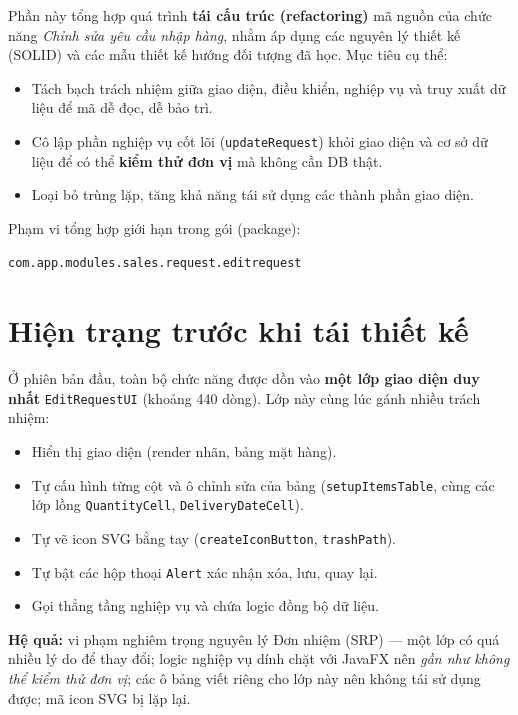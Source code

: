 \documentclass[12pt,a4paper]{article}
\begin{document}
Phần này tổng hợp quá trình \textbf{tái cấu trúc (refactoring)} mã nguồn của
chức năng \emph{Chỉnh sửa yêu cầu nhập hàng}, nhằm áp dụng các nguyên lý thiết
kế (SOLID) và các mẫu thiết kế hướng đối tượng đã học. Mục tiêu cụ thể:

\begin{itemize}[leftmargin=*]
  \item Tách bạch trách nhiệm giữa giao diện, điều khiển, nghiệp vụ và truy
        xuất dữ liệu để mã dễ đọc, dễ bảo trì.
  \item Cô lập phần nghiệp vụ cốt lõi (\texttt{updateRequest}) khỏi giao diện
        và cơ sở dữ liệu để có thể \textbf{kiểm thử đơn vị} mà không cần DB thật.
  \item Loại bỏ trùng lặp, tăng khả năng tái sử dụng các thành phần giao diện.
\end{itemize}

Phạm vi tổng hợp giới hạn trong gói (package):
\begin{center}
\texttt{com.app.modules.sales.request.editrequest}
\end{center}

\section{Hiện trạng trước khi tái thiết kế}

Ở phiên bản đầu, toàn bộ chức năng được dồn vào \textbf{một lớp giao diện duy
nhất} \texttt{EditRequestUI} (khoảng 440 dòng). Lớp này cùng lúc gánh nhiều
trách nhiệm:

\begin{itemize}[leftmargin=*]
  \item Hiển thị giao diện (render nhãn, bảng mặt hàng).
  \item Tự cấu hình từng cột và ô chỉnh sửa của bảng (\texttt{setupItemsTable},
        cùng các lớp lồng \texttt{QuantityCell}, \texttt{DeliveryDateCell}).
  \item Tự vẽ icon SVG bằng tay (\texttt{createIconButton}, \texttt{trashPath}).
  \item Tự bật các hộp thoại \texttt{Alert} xác nhận xóa, lưu, quay lại.
  \item Gọi thẳng tầng nghiệp vụ và chứa logic đồng bộ dữ liệu.
\end{itemize}

\noindent\textbf{Hệ quả:} vi phạm nghiêm trọng nguyên lý Đơn nhiệm (SRP) --- một
lớp có quá nhiều lý do để thay đổi; logic nghiệp vụ dính chặt với JavaFX nên
\emph{gần như không thể kiểm thử đơn vị}; các ô bảng viết riêng cho lớp này nên
không tái sử dụng được; mã icon SVG bị lặp lại.
\end{document}
